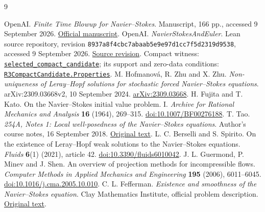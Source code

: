 \documentclass[11pt,a4paper]{article}
\theoremstyle{definition}\newtheorem{definition}[theorem]{Definition}
\theoremstyle{remark}\newtheorem{remark}[theorem]{Remark}
\begin{document}
\begin{thebibliography}{9}\small\raggedright
{}
OpenAI. \emph{Finite Time Blowup for Navier--Stokes}. Manuscript, 166 pp., accessed 9 September 2026.
\href{https://cdn.openai.com/pdf/32d9f210-8b73-45e0-91bc-82a30aef8a9a/navier-stokes.pdf}{Official manuscript}.
OpenAI. \emph{NavierStokesAndEuler}. Lean source repository, revision
\texttt{8937a8f4cbc7abaab5e9e97d1cc7f5d2319d9538}, accessed 9 September 2026.
\href{https://github.com/openai/NavierStokesAndEuler/tree/8937a8f4cbc7abaab5e9e97d1cc7f5d2319d9538}{Source revision}.
Compact witness: \href{https://github.com/openai/NavierStokesAndEuler/blob/8937a8f4cbc7abaab5e9e97d1cc7f5d2319d9538/NavierStokes/R3ActualCandidate.lean#L18-L21}{\texttt{selected\_compact\_candidate}};
its support and zero-data conditions: \href{https://github.com/openai/NavierStokesAndEuler/blob/8937a8f4cbc7abaab5e9e97d1cc7f5d2319d9538/NavierStokes/R3CompactCandidate.lean#L24-L37}{\texttt{R3CompactCandidate.Properties}}.
M. Hofmanov\'a, R. Zhu and X. Zhu.
\emph{Non-uniqueness of Leray--Hopf solutions for stochastic forced Navier--Stokes equations}.
arXiv:2309.03668v2, 10 September 2024.
\href{https://arxiv.org/abs/2309.03668}{arXiv:2309.03668}.
H. Fujita and T. Kato. On the Navier--Stokes initial value problem. I.
\emph{Archive for Rational Mechanics and Analysis} \textbf{16} (1964), 269--315.
\href{https://doi.org/10.1007/BF00276188}{doi:10.1007/BF00276188}.
T. Tao. \emph{254A, Notes 1: Local well-posedness of the Navier--Stokes equations}.
Author's course notes, 16 September 2018.
\href{https://terrytao.wordpress.com/2018/09/16/254a-notes-1-local-well-posedness-of-the-navier-stokes-equations/}{Original text}.
L. C. Berselli and S. Spirito. On the existence of Leray--Hopf weak solutions to the Navier--Stokes equations.
\emph{Fluids} \textbf{6}(1) (2021), article 42.
\href{https://doi.org/10.3390/fluids6010042}{doi:10.3390/fluids6010042}.
J. L. Guermond, P. Minev and J. Shen. An overview of projection methods for incompressible flows.
\emph{Computer Methods in Applied Mechanics and Engineering} \textbf{195} (2006), 6011--6045.
\href{https://doi.org/10.1016/j.cma.2005.10.010}{doi:10.1016/j.cma.2005.10.010}.
C. L. Fefferman. \emph{Existence and smoothness of the Navier--Stokes equation}.
Clay Mathematics Institute, official problem description.
\href{https://www.claymath.org/wp-content/uploads/2022/06/navierstokes.pdf}{Original text}.
\end{thebibliography}
\end{document}
